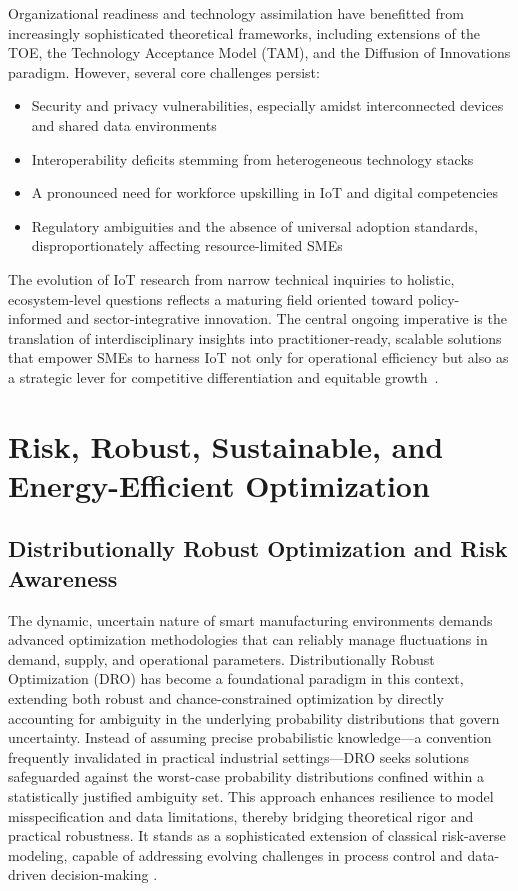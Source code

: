 \documentclass[sigconf]{acmart}
\begin{document}
Organizational readiness and technology assimilation have benefitted from increasingly sophisticated theoretical frameworks, including extensions of the TOE, the Technology Acceptance Model (TAM), and the Diffusion of Innovations paradigm. However, several core challenges persist:
\begin{itemize}
    \item Security and privacy vulnerabilities, especially amidst interconnected devices and shared data environments
    \item Interoperability deficits stemming from heterogeneous technology stacks
    \item A pronounced need for workforce upskilling in IoT and digital competencies
    \item Regulatory ambiguities and the absence of universal adoption standards, disproportionately affecting resource-limited SMEs
\end{itemize}

The evolution of IoT research from narrow technical inquiries to holistic, ecosystem-level questions reflects a maturing field oriented toward policy-informed and sector-integrative innovation. The central ongoing imperative is the translation of interdisciplinary insights into practitioner-ready, scalable solutions that empower SMEs to harness IoT not only for operational efficiency but also as a strategic lever for competitive differentiation and equitable growth~\cite{ref33}.

\section{Risk, Robust, Sustainable, and Energy-Efficient Optimization}

\subsection{Distributionally Robust Optimization and Risk Awareness}

The dynamic, uncertain nature of smart manufacturing environments demands advanced optimization methodologies that can reliably manage fluctuations in demand, supply, and operational parameters. Distributionally Robust Optimization (DRO) has become a foundational paradigm in this context, extending both robust and chance-constrained optimization by directly accounting for ambiguity in the underlying probability distributions that govern uncertainty. Instead of assuming precise probabilistic knowledge—a convention frequently invalidated in practical industrial settings—DRO seeks solutions safeguarded against the worst-case probability distributions confined within a statistically justified ambiguity set. This approach enhances resilience to model misspecification and data limitations, thereby bridging theoretical rigor and practical robustness. It stands as a sophisticated extension of classical risk-averse modeling, capable of addressing evolving challenges in process control and data-driven decision-making \cite{ref77}.
\end{document}
